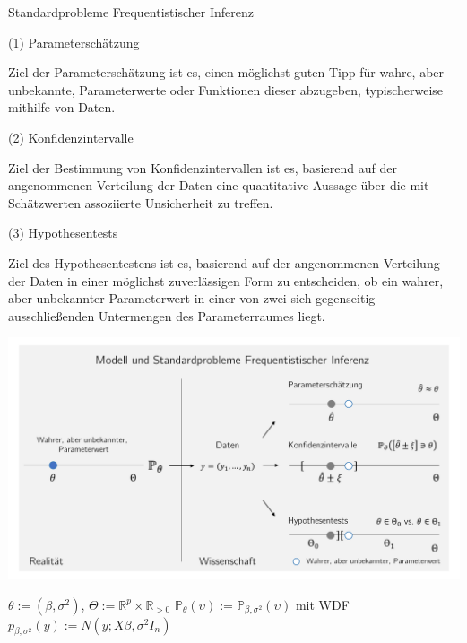 \documentclass[
  8pt,
  ignorenonframetext,
]{beamer}
\begin{document}
\begin{frame}{}
\protect\hypertarget{section-4}{}
Standardprobleme Frequentistischer Inferenz

\small
\vspace{2mm}

\noindent (1) Parameterschätzung

Ziel der Parameterschätzung ist es, einen möglichst guten Tipp für
wahre, aber unbekannte, Parameterwerte oder Funktionen dieser abzugeben,
typischerweise mithilfe von Daten.

\vspace{2mm}

\noindent (2) Konfidenzintervalle

Ziel der Bestimmung von Konfidenzintervallen ist es, basierend auf der
angenommenen Verteilung der Daten eine quantitative Aussage über die mit
Schätzwerten assoziierte Unsicherheit zu treffen.

\vspace{2mm}

\noindent (3) Hypothesentests

Ziel des Hypothesentestens ist es, basierend auf der angenommenen
Verteilung der Daten in einer möglichst zuverlässigen Form zu
entscheiden, ob ein wahrer, aber unbekannter Parameterwert in einer von
zwei sich gegenseitig ausschließenden Untermengen des Parameterraumes
liegt.
\end{frame}

\begin{frame}{}
\protect\hypertarget{section-5}{}
\center

\begin{center}\includegraphics[width=1\linewidth]{5_Abbildungen/alm_5_frequentistische_inferenz} \end{center}
\center
\footnotesize

\(\theta := (\beta,\sigma^2)\),
\(\Theta := \mathbb{R}^p \times \mathbb{R}_{>0}\)
\(\mathbb{P}_\theta(\upsilon) := \mathbb{P}_{\beta,\sigma^2}(\upsilon)\)
mit WDF \(p_{\beta,\sigma^2}(y) := N(y;X\beta,\sigma^2I_n)\)
\end{frame}
\end{document}

